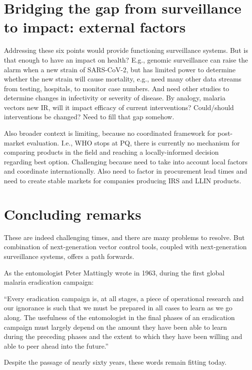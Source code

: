 \documentclass[a4paper,11pt,abstracton,hidelinks]{scrartcl}
\begin{document}
\section{Bridging the gap from surveillance to impact: external factors}\label{sec:external}


Addressing these six points would provide functioning surveillance systems.
%
But is that enough to have an impact on health?
%
E.g., genomic surveillance can raise the alarm when a new strain of SARS-CoV-2, but has limited power to determine whether the new strain will cause mortality, e.g., need many other data streams from testing, hospitals, to monitor case numbers.
And need other studies to determine changes in infectivity or severity of disease.
%
By analogy, malaria vectors new IR, will it impact efficacy of current interventions?
Could/should interventions be changed?
Need to fill that gap somehow.


Also broader context is limiting, because no coordinated framework for post-market evaluation.
%
I.e., WHO stops at PQ, there is currently no mechanism for comparing products in the field and reaching a locally-informed decision regarding best option.
%
Challenging because need to take into account local factors and coordinate internationally.
%
Also need to factor in procurement lead times and need to create stable markets for companies producing IRS and LLIN products.


\section{Concluding remarks}\label{sec:conclusions}


These are indeed challenging times, and there are many problems to resolve.
But combination of next-generation vector control tools, coupled with next-generation surveillance systems, offers a path forwards.


As the entomologist Peter Mattingly wrote in 1963, during the first global malaria eradication campaign:


\begin{displayquote}
``Every eradication campaign is, at all stages, a piece of operational research and our ignorance is such that we must be prepared in all cases to learn as we go along. The usefulness of the entomologist in the final phases of an eradication campaign must largely depend on the amount they have been able to learn during the preceding phases and the extent to which they have been willing and able to peer ahead into the future.''
\end{displayquote}


Despite the passage of nearly sixty years, these words remain fitting today.


\printbibliography
\end{document}
